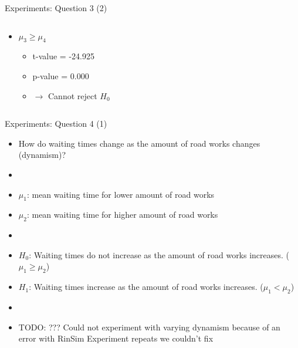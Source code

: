 \begin{frame}{Experiments: Question 3 (2)}
\begin{columns}
\begin{column}{0.5\textwidth}
\begin{itemize}
                \item $\mu_3 \geq \mu_4$
                    \begin{itemize}
                        \item t-value = -24.925
                        \item p-value = 0.000
                        \item $\rightarrow$ Cannot reject $H_0$
                    \end{itemize}
            \end{itemize}
        \end{column}

    \end{columns}
\end{frame}



\begin{frame}{Experiments: Question 4 (1)}
    \begin{itemize}
        \item How do waiting times change as the amount of road works changes (dynamism)?
        \item[]
        \item $\mu_1$: mean waiting time for lower amount of road works
        \item $\mu_2$: mean waiting time for higher amount of road works
        \item[]
        \item $H_0$: Waiting times do not increase as the amount of road works increases. ($\mu_1 \geq \mu_2$)
        \item $H_1$: Waiting times increase as the amount of road works increases. ($\mu_1 < \mu_2$)
        \item[]
        \item TODO: ??? Could not experiment with varying dynamism because of an error with RinSim Experiment repeats we couldn't fix

    \end{itemize}
\end{frame}

